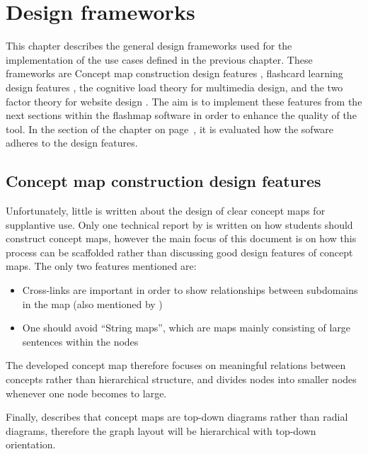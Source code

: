 \chapter{Design frameworks}
\label{ch:frameworks}

This chapter describes the general design frameworks used for the implementation of the use cases defined in the previous chapter. These frameworks are Concept map construction design features \cite{constructcmaps}, flashcard learning design features \cite{nakata}, the cognitive load theory \cite{cognitiveload} for multimedia design, and the two factor theory for website design \cite{websitedesign}. The aim is to implement these features from the next sections within the flashmap software in order to enhance the quality of the tool. In the  section of the  chapter on page~\pageref{sec:screening}, it is evaluated how the sofware adheres to the design features.

    \section{Concept map construction design features}

Unfortunately, little is written about the design of clear concept maps for supplantive use. Only one technical report by \cite{constructcmaps} is written on how students should construct concept maps, however the main focus of this document is on how this process can be scaffolded rather than discussing good design features of concept maps. The only two features mentioned are:

\begin{itemize}
    \item Cross-links are important in order to show relationships between subdomains in the map (also mentioned by )
    \item One should avoid ``String maps'', which are maps mainly consisting of large sentences within the nodes
\end{itemize}

The developed concept map therefore focuses on meaningful relations between concepts rather than hierarchical structure, and divides nodes into smaller nodes whenever one node becomes to large.

Finally,  describes that concept maps are top-down diagrams rather than radial diagrams, therefore the graph layout will be hierarchical with top-down orientation.

